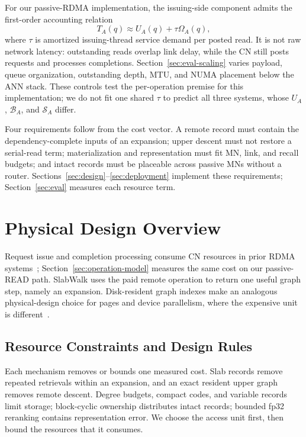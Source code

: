 \documentclass[sigconf,nonacm]{acmart}
\begin{document}
For our passive-RDMA implementation, the issuing-side component admits the
first-order accounting relation
\begin{equation}
  T_A(q)\approx U_A(q)+\tau\Omega_A(q),
  \label{eq:rdma-cost}
\end{equation}
where $\tau$ is amortized issuing-thread service demand per posted read.  It is
not raw network latency: outstanding reads overlap link delay, while the CN
still posts requests and processes completions.  Section~\ref{sec:eval-scaling}
varies payload, queue organization, outstanding depth, MTU, and NUMA placement
below the ANN stack.  These controls test the per-operation premise for this
implementation; we do not fit one shared $\tau$ to predict all three systems,
whose $U_A$, $\mathcal{B}_A$, and $\mathcal{S}_A$ differ.

Four requirements follow from the cost vector.  A remote record must contain
the dependency-complete inputs of an expansion; upper descent must not restore
a serial-read term; materialization and representation must fit MN, link, and
recall budgets; and intact records must be placeable across passive MNs without
a router.  Sections~\ref{sec:design}--\ref{sec:deployment} implement these
requirements; Section~\ref{sec:eval} measures each resource term.

\section{Physical Design Overview}
\label{sec:overview}

Request issue and completion processing consume CN resources in prior RDMA
systems~\cite{herd,fasst,erpc}; Section~\ref{sec:operation-model} measures the
same cost on our passive-READ path.  SlabWalk uses the paid remote operation to
return one useful graph step, namely an expansion.  Disk-resident graph indexes
make an analogous physical-design choice for pages and device parallelism,
where the expensive unit is different~\cite{starling,ssdpgvector}.

\subsection{Resource Constraints and Design Rules}
\label{sec:cost-model}

Each mechanism removes or bounds one measured cost.  Slab records remove
repeated retrievals within an expansion, and an exact resident upper graph
removes remote descent.  Degree budgets, compact codes, and variable records
limit storage; block-cyclic ownership distributes intact records; bounded fp32
reranking contains representation error.  We choose the access unit first,
then bound the resources that it consumes.
\end{document}
